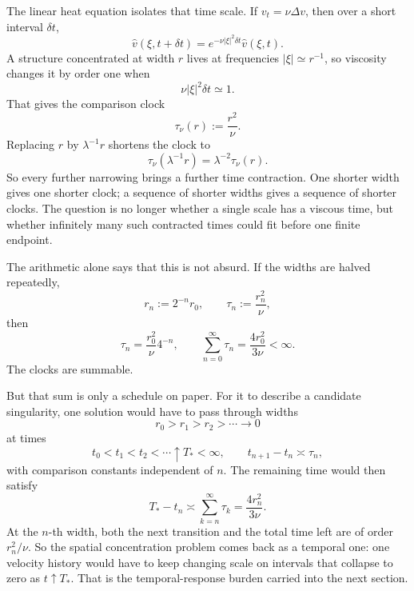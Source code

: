 The linear heat equation isolates that time scale. If \(v_t=\nu\Delta v\), then over a short interval \(\delta t\),
\[
  \widehat v(\xi,t+\delta t)
  =
  e^{-\nu|\xi|^2\delta t}\widehat v(\xi,t).
\]
A structure concentrated at width \(r\) lives at frequencies \(|\xi|\simeq r^{-1}\), so viscosity changes it by order one when
\[
  \nu|\xi|^2\delta t\simeq1.
\]
That gives the comparison clock
\[
  \tau_\nu(r)
  :=
  \frac{r^2}{\nu}.
\]
Replacing \(r\) by \(\lambda^{-1}r\) shortens the clock to
\[
  \tau_\nu(\lambda^{-1}r)
  =
  \lambda^{-2}\tau_\nu(r).
\]
So every further narrowing brings a further time contraction. One shorter width gives one shorter clock; a sequence of shorter widths gives a sequence of shorter clocks. The question is no longer whether a single scale has a viscous time, but whether infinitely many such contracted times could fit before one finite endpoint.


The arithmetic alone says that this is not absurd. If the widths are halved repeatedly,
\[
  r_n:=2^{-n}r_0,
  \qquad
  \tau_n:=\frac{r_n^2}{\nu},
\]
then
\[
  \tau_n
  =
  \frac{r_0^2}{\nu}4^{-n},
  \qquad
  \sum_{n=0}^{\infty}\tau_n
  =
  \frac{4r_0^2}{3\nu}
  <
  \infty.
\]
The clocks are summable.

But that sum is only a schedule on paper. For it to describe a candidate singularity, one \NavierStokes{} solution would have to pass through widths
\[
  r_0>r_1>r_2>\cdots\longrightarrow0
\]
at times
\[
  t_0<t_1<t_2<\cdots\uparrow T_*<\infty,
  \qquad
  t_{n+1}-t_n\asymp\tau_n,
\]
with comparison constants independent of \(n\). The remaining time would then satisfy
\[
  T_*-t_n
  \asymp
  \sum_{k=n}^{\infty}\tau_k
  =
  \frac{4r_n^2}{3\nu}.
\]
At the \(n\)-th width, both the next transition and the total time left are of order \(r_n^2/\nu\). So the spatial concentration problem comes back as a temporal one: one velocity history would have to keep changing scale on intervals that collapse to zero as \(t\uparrow T_*\). That is the temporal-response burden carried into the next section.
